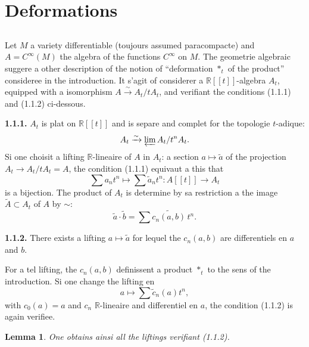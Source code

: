 \documentclass[11pt,a4paper]{article}
\theoremstyle{plain}
\newtheorem{lemma}[theorem]{Lemma}
\theoremstyle{definition}
\newcommand{\R}{\mathbb{R}}
\newcommand{\iso}{\xrightarrow{\sim}}
\begin{document}
\section{Deformations}

\subsection{}

Let $M$ a variety differentiable (toujours assumed paracompacte) and
$A = C^{\infty}(M)$ the algebra of the functions $C^{\infty}$ on $M$. The geometrie algebraic suggere
a other description of the notion of ``deformation $*_{t}$ of the product'' consideree in
the introduction. It s'agit of considerer a $\R[[t]]$-algebra $A_{t}$, equipped with a isomorphism
$A \iso A_{t}/tA_{t}$, and verifiant the conditions (1.1.1) and (1.1.2) ci-dessous.

\medskip
\noindent \textbf{1.1.1.} $A_{t}$ is plat on $\R[[t]]$ and is separe and complet for the topologie $t$-adique:
\[
A_{t} \iso \varprojlim A_{t}/t^{n}A_{t}.
\]
Si one choisit a lifting $\R$-lineaire of $A$ in $A_{t}$: a section $a \mapsto \tilde{a}$ of the
projection $A_{t} \to A_{t}/tA_{t} = A$, the condition (1.1.1) equivaut a this that
\[
\sum a_{n} t^{n} \longmapsto \sum \tilde{a}_{n} t^{n} : A[[t]] \longrightarrow A_{t}
\]
is a bijection. The product of $A_{t}$ is determine by sa restriction a the image $\tilde{A} \subset A_{t}$
of $A$ by $\sim$:
\[
\tilde{a} \cdot \tilde{b} = \sum \widetilde{c_{n}(a,b)}\, t^{n}.
\]

\medskip
\noindent \textbf{1.1.2.} There exists a lifting $a \mapsto \tilde{a}$ for lequel the $c_{n}(a, b)$ are differentiels en $a$
and $b$.

\medskip
For a tel lifting, the $c_{n}(a, b)$ definissent a product $*_{t}$ to the sens of
the introduction. Si one change the lifting en
\begin{equation}
a \longmapsto \sum \tilde{c}_{n}(a) t^{n}, \tag{1.1.3}
\end{equation}
with $c_{0}(a) = a$ and $c_{n}$ $\R$-lineaire and differentiel en $a$, the condition (1.1.2) is again
verifiee.

\begin{lemma}
One obtains ainsi all the liftings verifiant \emph{(1.1.2)}.
\end{lemma}
\end{document}
